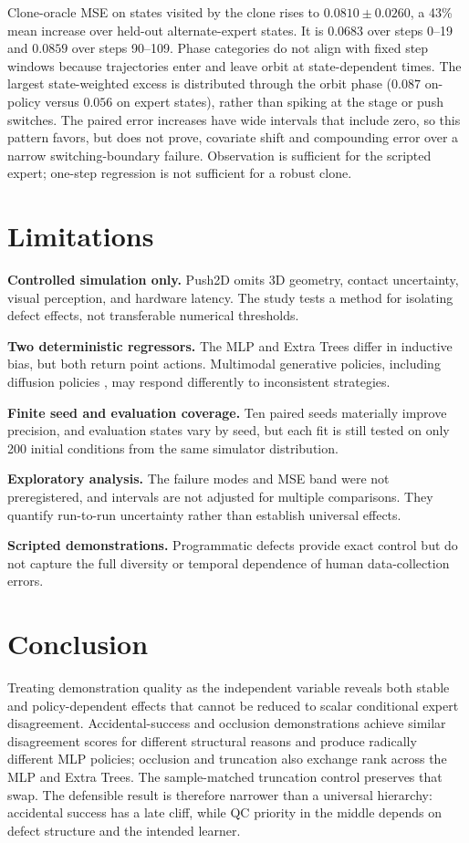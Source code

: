 \documentclass[10pt,twocolumn]{article}
\begin{document}
Clone-oracle MSE on states visited by the clone rises to $0.0810\pm0.0260$, a
43\% mean increase over held-out alternate-expert states. It is $0.0683$ over
steps 0--19 and $0.0859$ over steps 90--109. Phase categories do not align with
fixed step windows because trajectories enter and leave orbit at
state-dependent times. The largest state-weighted excess is distributed
through the orbit phase ($0.087$ on-policy versus $0.056$ on expert states),
rather than spiking at the stage or push switches. The paired
error increases have wide intervals that include zero, so this pattern favors,
but does not prove, covariate shift and compounding error over a narrow
switching-boundary failure. Observation is sufficient for the scripted expert;
one-step regression is not sufficient for a robust clone.

\section{Limitations}

\textbf{Controlled simulation only.} Push2D omits 3D geometry, contact
uncertainty, visual perception, and hardware latency. The study tests a method
for isolating defect effects, not transferable numerical thresholds.

\textbf{Two deterministic regressors.} The MLP and Extra Trees differ in
inductive bias, but both return point actions. Multimodal generative policies,
including diffusion policies \cite{chi2023diffusion}, may respond differently
to inconsistent strategies.

\textbf{Finite seed and evaluation coverage.} Ten paired seeds materially
improve precision, and evaluation states vary by seed, but each fit is still
tested on only 200 initial conditions from the same simulator distribution.

\textbf{Exploratory analysis.} The failure modes and MSE band were not
preregistered, and intervals are not adjusted for multiple comparisons. They
quantify run-to-run uncertainty rather than establish universal effects.

\textbf{Scripted demonstrations.} Programmatic defects provide exact control
but do not capture the full diversity or temporal dependence of human
data-collection errors.

\section{Conclusion}

Treating demonstration quality as the independent variable reveals both
stable and policy-dependent effects that cannot be reduced to scalar
conditional expert disagreement. Accidental-success and occlusion
demonstrations achieve similar disagreement scores for different structural
reasons and produce radically different MLP policies;
occlusion and truncation also exchange rank across the MLP and Extra Trees.
The sample-matched truncation control preserves that swap. The defensible
result is therefore narrower than a universal hierarchy:
accidental success has a late cliff, while QC priority in the middle depends
on defect structure and the intended learner.
\end{document}
